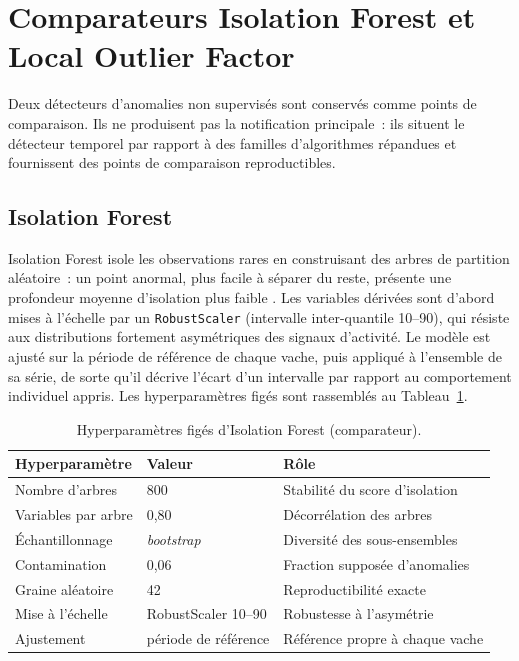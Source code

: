 \section{Comparateurs Isolation Forest et Local Outlier Factor}
\label{sec:comparateurs}

Deux détecteurs d'anomalies non supervisés sont conservés comme points de comparaison. Ils
ne produisent pas la notification principale~: ils situent le détecteur temporel par rapport
à des familles d'algorithmes répandues et fournissent des points de comparaison reproductibles.

\subsection{Isolation Forest}

Isolation Forest isole les observations rares en construisant des arbres de partition
aléatoire~: un point anormal, plus facile à séparer du reste, présente une profondeur
moyenne d'isolation plus faible \citep{liu2008isolation}. Les variables dérivées sont
d'abord mises à l'échelle par un \texttt{RobustScaler} (intervalle inter-quantile
10--90), qui résiste aux distributions fortement asymétriques des signaux d'activité. Le
modèle est ajusté sur la période de référence de chaque vache, puis appliqué à l'ensemble de sa
série, de sorte qu'il décrive l'écart d'un intervalle par rapport au comportement
individuel appris. Les hyperparamètres figés sont rassemblés au
Tableau~\ref{tab:if_hyperparams}.

\begin{table}[H]
  \centering
  \caption{Hyperparamètres figés d'Isolation Forest (comparateur).}
  \label{tab:if_hyperparams}
  \small
  \begin{tabular}{p{}p{}p{}}
    \toprule
    Hyperparamètre & Valeur & Rôle \\
    \midrule
    Nombre d'arbres & 800 & Stabilité du score d'isolation \\
    Variables par arbre & 0,80 & Décorrélation des arbres \\
    Échantillonnage & \textit{bootstrap} & Diversité des sous-ensembles \\
    Contamination & 0,06 & Fraction supposée d'anomalies \\
    Graine aléatoire & 42 & Reproductibilité exacte \\
    Mise à l'échelle & RobustScaler 10--90 & Robustesse à l'asymétrie \\
    Ajustement & période de référence & Référence propre à chaque vache \\
    \bottomrule
  \end{tabular}
\end{table}

